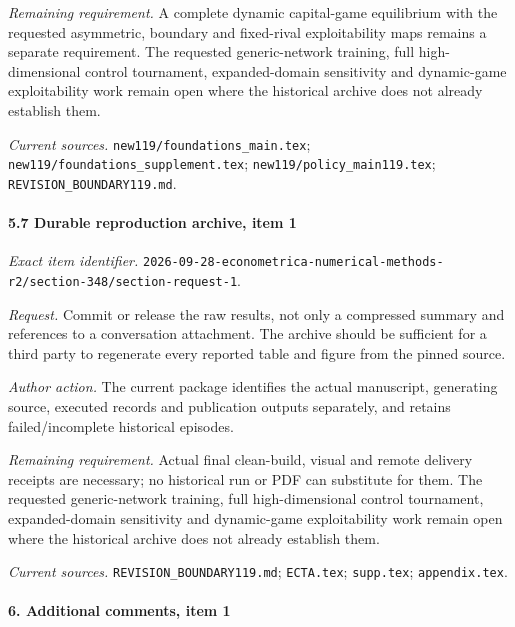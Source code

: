 \par\emph{Remaining requirement.} A complete dynamic capital-game equilibrium with the requested asymmetric, boundary and fixed-rival exploitability maps remains a separate requirement. The requested generic-network training, full high-dimensional control tournament, expanded-domain sensitivity and dynamic-game exploitability work remain open where the historical archive does not already establish them.

\par\emph{Current sources.} \nolinkurl{new119/foundations_main.tex}; \nolinkurl{new119/foundations_supplement.tex}; \nolinkurl{new119/policy_main119.tex}; \nolinkurl{REVISION_BOUNDARY119.md}.

\paragraph{5.7 Durable reproduction archive, item 1}

\emph{Exact item identifier.} \nolinkurl{2026-09-28-econometrica-numerical-methods-r2/section-348/section-request-1}.

\par\emph{Request.} Commit or release the raw results, not only a compressed summary and references to a conversation attachment. The archive should be sufficient for a third party to regenerate every reported table and figure from the pinned source.

\par\emph{Author action.} The current package identifies the actual manuscript, generating source, executed records and publication outputs separately, and retains failed/\allowbreak{}incomplete historical episodes.

\par\emph{Remaining requirement.} Actual final clean-build, visual and remote delivery receipts are necessary; no historical run or PDF can substitute for them. The requested generic-network training, full high-dimensional control tournament, expanded-domain sensitivity and dynamic-game exploitability work remain open where the historical archive does not already establish them.

\par\emph{Current sources.} \nolinkurl{REVISION_BOUNDARY119.md}; \nolinkurl{ECTA.tex}; \nolinkurl{supp.tex}; \nolinkurl{appendix.tex}.

\paragraph{6. Additional comments, item 1}

